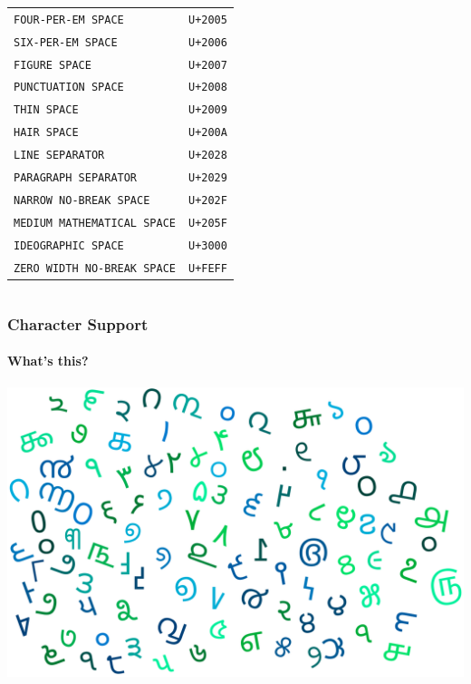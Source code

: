 \documentclass[
    alternativetitlepage=alternativ,
    cornerlogo=hgi_nds_logo2,
    sectionoverview,
]{rubpresentation}
\begin{document}
\begin{frame}
\begin{itemize}
\begin{columns}
\begin{column}{0.5\textwidth}
          \begin{center}
            \begin{tabular}{lr}
              \texttt{FOUR-PER-EM SPACE}                  & \texttt{U+2005}\\
              \texttt{SIX-PER-EM SPACE}                   & \texttt{U+2006}\\
              \texttt{FIGURE SPACE}                       & \texttt{U+2007}\\
              \texttt{PUNCTUATION SPACE}                  & \texttt{U+2008}\\
              \texttt{THIN SPACE}                         & \texttt{U+2009}\\
              \texttt{HAIR SPACE}                         & \texttt{U+200A}\\
              \texttt{LINE SEPARATOR}                     & \texttt{U+2028}\\
              \texttt{PARAGRAPH SEPARATOR}                & \texttt{U+2029}\\
              \texttt{NARROW NO-BREAK SPACE}              & \texttt{U+202F}\\
              \texttt{MEDIUM MATHEMATICAL SPACE}          & \texttt{U+205F}\\
              \texttt{IDEOGRAPHIC SPACE}                  & \texttt{U+3000}\\
              \texttt{ZERO WIDTH NO-BREAK SPACE}          & \texttt{U+FEFF}\\
            \end{tabular}
          \end{center}
        \end{column}
      \end{columns}
    \endgroup
  \end{itemize}
\end{frame}

\begin{frame}
  \frametitle{Character Support}
  \framesubtitle{What's this?}
  \includegraphics[width=\textwidth]{letternumerals}
\end{frame}
\end{document}
